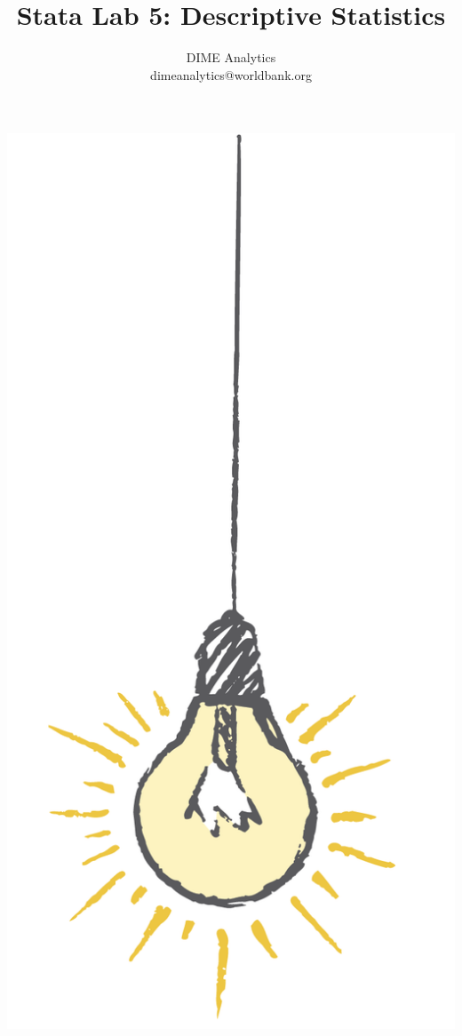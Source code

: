 \documentclass{tufte-handout}
\title{Stata Lab 5: Descriptive Statistics}
\author{DIME Analytics \\ dimeanalytics@worldbank.org}
\begin{document}
\maketitle%

\begin{marginfigure}%
  \includegraphics[width=\linewidth]{light.png}
\end{marginfigure}
\end{document}
